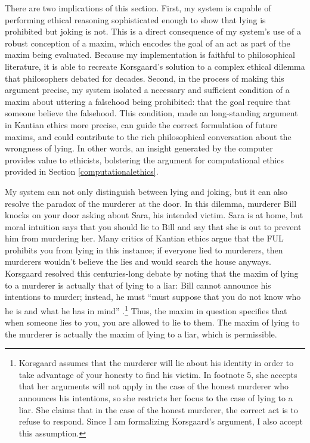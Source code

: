 \begin{isabellebody}
\begin{isamarkuptext}
There are two implications of this section. First, my system is capable of performing ethical reasoning
sophisticated enough to show that lying is prohibited but joking is not. This is a direct consequence 
of my system's use of a robust conception of a maxim, which encodes the goal of an act as part of the 
maxim being evaluated. Because my implementation is faithful to philosophical literature, it is able 
to recreate Korsgaard's solution to a complex ethical dilemma that philosophers debated for decades. Second, 
in the process of making this argument precise, my system isolated a necessary and sufficient condition 
of a maxim about uttering a falsehood being prohibited: that the goal require that someone believe
the falsehood. This condition, made an long-standing argument in Kantian ethics more precise, can guide 
the correct formulation of future maxims, and could contribute to the rich philosophical conversation
about the wrongness of lying. In other words, an insight generated by the
computer provides value to ethicists, bolstering the argument for computational ethics provided in 
Section \ref{computationalethics}.%
\end{isamarkuptext}\isamarkuptrue%
%
\isadelimdocument
%
\endisadelimdocument
%
\isatagdocument
%
\isamarkuptrue%
%
\endisatagdocument
{\isafolddocument}%
%
\isadelimdocument
%
\endisadelimdocument
%
\begin{isamarkuptext}%
My system can not only distinguish between lying and joking, but it can also resolve the paradox of 
the murderer at the door. In this dilemma, murderer Bill knocks on your door asking about Sara, his 
intended victim. Sara is at home, but moral intuition says that you should lie to Bill and say 
that she is out to prevent him from murdering her. Many critics of Kantian ethics argue that the 
FUL prohibits you from lying in this instance; if everyone lied to murderers, then murderers wouldn't 
believe the lies and would search the house anyways. Korsgaard resolved this centuries-long debate by 
noting that the maxim of lying to a murderer is actually that of lying to a liar: Bill cannot 
announce his intentions to murder; instead, he must ``must suppose that you do not know who he is 
and what he has in mind'' \citep{KorsgaardRTL}.\footnote{Korsgaard assumes that the murderer will 
lie about his identity in order to take advantage of your honesty to find his victim. In footnote 5, 
she accepts that her arguments will not apply in the case of the honest murderer 
who announces his intentions, so she restricts her focus to the case of lying to a liar. She claims 
that in the case of the honest murderer, the correct act is to refuse to respond. Since I am formalizing
Korsgaard's argument, I also accept this assumption.} Thus, the maxim 
in question specifies that when someone lies to you, you are allowed to lie to them. The maxim of 
lying to the murderer is actually the maxim of lying to a liar, which is permissible. 


\end{isamarkuptext}
\end{isabellebody}
